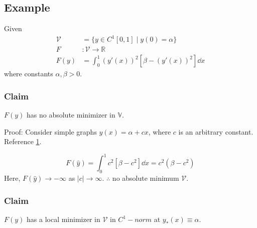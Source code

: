 \documentclass[12pt,twoside]{article}
\begin{document}
\subsection{Example}
Given
\begin{align*}
  \mathcal{V} &= \{y\in C^1[0,1] \;|\; y(0)=\alpha\} \\
  F&:\mathcal{V} \rightarrow \mathbb{R} \\
  F(y) &= \int_0^1 {(y'(x))}^2 [\beta-{(y'(x))}^2]\dd{x}
\end{align*}
where constants $\alpha, \beta > 0$.
\subsubsection*{Claim}
$F(y)$ has no absolute minimizer in $\mathbb{V}$.

Proof: Consider simple graphs $\hat{y}(x)=\alpha+cx$, where $c$ is an arbitrary
constant. Reference \cref{fig:what3}.

\begin{figure}[ht]
  \centering
  \caption{}
  \label{fig:what3}
\end{figure}

\begin{equation*}
  F(\hat{y}) = \int_0^1 c^2[\beta-c^2]\dd{x} = c^2(\beta-c^2)
\end{equation*}
Here, $F(\hat{y})\rightarrow -\infty$ as $|c|\rightarrow\infty$. $\therefore$ no
absolute minimum $\mathcal{V}$.

\subsubsection*{Claim}
$F(y)$ has a local minimizer in $\mathcal{V}$ in $C^1-norm$ at
$y_*(x)\equiv\alpha$.
\end{document}
